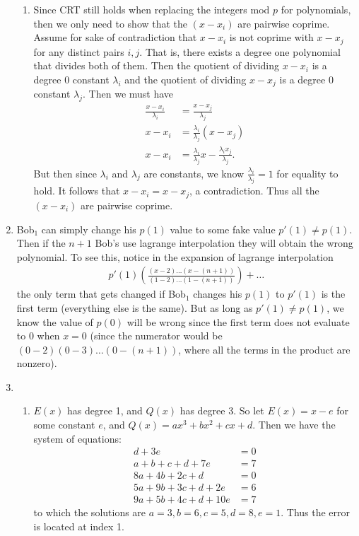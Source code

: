 \begin{enumerate}
\begin{enumerate}
            \item Since CRT still holds when replacing the integers mod $p$ for polynomials, then we only need to show that the $(x - x_i)$ are pairwise coprime. Assume for sake of contradiction that $x - x_i$ is not coprime with $x - x_j$ for any distinct pairs $i,j$. That is, there exists a degree one polynomial that divides both of them. Then the quotient of dividing $x - x_i$ is a degree 0 constant $\lambda_i$ and the quotient of dividing $x - x_j$ is a degree 0 constant $\lambda_j$. Then we must have
            \begin{align*}
                \frac{x - x_i}{\lambda_i} &= \frac{x - x_j}{\lambda_j} \\
                x - x_i &= \frac{\lambda_i}{\lambda_j}(x - x_j) \\
                x - x_i &= \frac{\lambda_i}{\lambda_j}x - \frac{\lambda_i x_j}{\lambda_j}.
            \end{align*}
            But then since $\lambda_i$ and $\lambda_j$ are constants, we know $\frac{\lambda_i}{\lambda_j} = 1$ for equality to hold. It follows that $x - x_i = x - x_j$, a contradiction. Thus all the $(x - x_i)$ are pairwise coprime.
        \end{enumerate}
        
        \item Bob$_1$ can simply change his $p(1)$ value to some fake value $p'(1) \neq p(1)$. Then if the $n+1$ Bob's use lagrange interpolation they will obtain the wrong polynomial. To see this, notice in the expansion of lagrange interpolation
        \begin{align*}
            p'(1)\left(\frac{(x-2) \ldots (x - (n + 1))}{(1-2) \ldots (1 - (n+1))}\right) + \ldots
        \end{align*}
        the only term that gets changed if Bob$_1$ changes his $p(1)$ to $p'(1)$ is the first term (everything else is the same). But as long as $p'(1) \neq p(1)$, we know the value of $p(0)$ will be wrong since the first term does not evaluate to 0 when $x = 0$ (since the numerator would be $(0-2)(0-3)\ldots(0-(n+1))$, where all the terms in the product are nonzero).
        
        \item \begin{enumerate}
            \item $E(x)$ has degree 1, and $Q(x)$ has degree 3. So let $E(x) = x - e$ for some constant $e$, and $Q(x) = ax^3 + bx^2 + cx + d$. Then we have the system of equations:
            \begin{align*}
                d + 3e &= 0 \\
                a + b + c + d + 7e &= 7 \\
                8a + 4b + 2c + d &= 0 \\
                5a + 9b + 3c + d + 2e &= 6 \\
                9a + 5b + 4c + d + 10e &= 7
            \end{align*}
            to which the solutions are $a = 3, b = 6, c = 5, d = 8, e = 1$. Thus the error is located at index 1.
            

\end{enumerate}
\end{enumerate}
